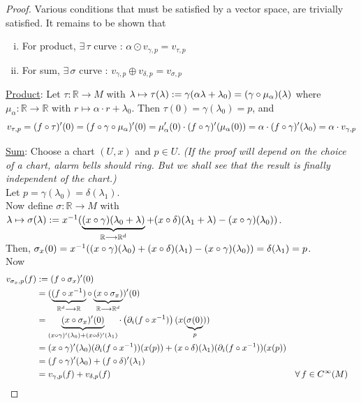 \begin{proof} Various conditions that must be satisfied by a vector space, are trivially satisfied. It remains to be shown that 
\begin{enumerate}[i)]
  \item For product, $\exists \, \tau $ curve : $\alpha \odot v_{\gamma,p} = v_{\tau,p}$
  \item For sum, $\exists \, \sigma$ curve : $v_{\gamma,p} \oplus v_{\delta,p} = v_{\sigma,p}$
\end{enumerate}
\underline{Product}: Let $\tau : \mathbb{R} \to M$ with $\lambda \mapsto \tau(\lambda) := \gamma(\alpha  \lambda + \lambda_0) = (\gamma \circ \mu_{\alpha})(\lambda)$
where $\mu_{\alpha} : \mathbb{R} \to \mathbb{R}$ with $r \mapsto \alpha \cdot r + \lambda_0$. Then $\tau(0) = \gamma(\lambda_0) = p$, and
\[
v_{\tau,p} = (f \circ \tau)^{\prime}(0) = (f \circ \gamma \circ \mu_{\alpha})^{\prime}(0) = \mu_{\alpha}^{\prime}(0) \cdot (f \circ \gamma)^{\prime}(\mu_{\alpha}(0)) = \alpha \cdot (f \circ \gamma)^{\prime}(\lambda_0) = \alpha \cdot v_{\gamma,p}
\]

\underline{Sum}: Choose a chart $(U,x)$ and $p \in U$. \textit{(If the proof will depend on the choice of a chart, alarm bells should ring. But we shall see that the result is finally independent of the chart.)} \\
Let $p = \gamma(\lambda_0) = \delta(\lambda_1)$. \\
Now define $\sigma : \mathbb{R} \to M$ with $\lambda \mapsto \sigma(\lambda) := x^{-1}(\underbrace{(x \circ \gamma)(\lambda_0 + \lambda)}_{\mathbb{R} \longrightarrow \mathbb{R}^d} + (x \circ \delta)(\lambda_1+ \lambda) - (x \circ \gamma)(\lambda_0))$. \\
Then, $\sigma_x(0) = x^{-1}((x \circ \gamma)(\lambda_0) + (x \circ \delta)(\lambda_1) - (x \circ \gamma)(\lambda_0)) = \delta(\lambda_1) = p$. \\
Now
\begin{align*}
  v_{\sigma_x,p}(f) & := (f \circ \sigma_x)^{\prime}(0) \\ 
  & = ( \underbrace{(f \circ x^{-1})}_{\mathbb{R}^d \longrightarrow \mathbb{R}} \circ \underbrace{(x \circ \sigma_x)}_{\mathbb{R} \longrightarrow \mathbb{R}^d})^{\prime}(0) \\
  & = \underbrace{(x \circ \sigma_x)^{\prime}(0)}_{(x \circ \gamma)^{\prime}(\lambda_0) + (x \circ \delta)^{\prime}(\lambda_1)} \cdot \left( \partial_i (f \circ x^{-1}) \right)(x(\underbrace{\sigma(0)}_{p})) \\
  & = (x \circ \gamma)^{\prime}(\lambda_0)(\partial_i (f \circ x^{-1}))(x(p)) + (x \circ \delta)(\lambda_1)(\partial_i (f \circ x^{-1}))(x(p)) \\
  & = (f \circ \gamma)^{\prime}(\lambda_0) + (f \circ \delta)^{\prime}(\lambda_1) \\
  & = v_{\gamma,p}(f) + v_{\delta,p}(f) && \forall \, f \in C^{\infty}(M)
\end{align*}
\end{proof}

